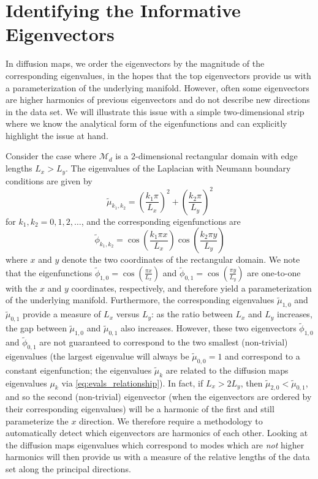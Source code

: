 \documentclass[preprint]{elsarticle}
\begin{document}
\section{Identifying the Informative Eigenvectors}

In diffusion maps, we order the eigenvectors by the magnitude of the corresponding eigenvalues, in the hopes that the top eigenvectors provide us with a parameterization of the underlying manifold.
%
However, often some eigenvectors are higher harmonics of previous eigenvectors and do not describe new directions in the data set. 
%
We will illustrate this issue with a simple two-dimensional strip where we know the analytical form of the eigenfunctions and can explicitly highlight the issue at hand. 

Consider the case where $\mathcal{M}_d$ is a $2$-dimensional rectangular domain with edge lengths $L_x  > L_y$. 
%
The eigenvalues of the Laplacian with Neumann boundary conditions are given by
\begin{equation}
\tilde{\mu}_{k_1, k_2} = \left( \frac{k_1 \pi}{L_x} \right)^2 + \left( \frac{k_2 \pi}{L_y} \right)^2
\end{equation}
for $k_1, k_2 = 0, 1, 2, \dots$,
and the corresponding eigenfunctions are 
\begin{equation}
\tilde{\phi}_{k_1, k_2} = \cos \left( \frac{k_1 \pi x}{L_x} \right) \cos \left( \frac{k_2 \pi y}{L_y} \right)
\end{equation}
where $x$ and $y$ denote the two coordinates of the rectangular domain. 
%
We note that the eigenfunctions $\tilde{\phi}_{1, 0} = \cos \left( \frac{\pi x}{L_x} \right)$ and $\tilde{\phi}_{0, 1} = \cos \left( \frac{\pi y}{L_y} \right)$ are one-to-one with the $x$ and $y$ coordinates, respectively, and therefore yield a parameterization of the underlying manifold. 
%
Furthermore, the corresponding eigenvalues $\tilde{\mu}_{1,0}$ and $\tilde{\mu}_{0,1}$ provide a measure of $L_x$ versus $L_y$: as the ratio between $L_x$ and $L_y$ increases, the gap between $\tilde{\mu}_{1,0}$ and $\tilde{\mu}_{0,1}$ also increases.
%
However, these two eigenvectors $\tilde{\phi}_{1, 0}$ and $\tilde{\phi}_{0, 1}$ are not guaranteed to correspond to the two smallest (non-trivial) eigenvalues (the largest eigenvalue will always be $\tilde{\mu}_{0,0} = 1$ and correspond to a constant eigenfunction; the eigenvalues $\tilde{\mu}_k$ are related to the diffusion maps eigenvalues $\mu_k$ via \eqref{eq:evals_relationship}). 
%
In fact, if $L_x > 2 L_y$, then $\tilde{\mu}_{2, 0} < \tilde{\mu}_{0, 1}$, and so the second (non-trivial) eigenvector (when the eigenvectors are ordered by their corresponding eigenvalues) will be a harmonic of the first and still parameterize the $x$ direction. 
%
We therefore require a methodology to automatically detect which eigenvectors are harmonics of each other. 
%
Looking at the diffusion maps eigenvalues which correspond to modes which are {\em not} higher harmonics will then provide us with a measure of the relative lengths of the data set along the principal directions. 
\end{document}
